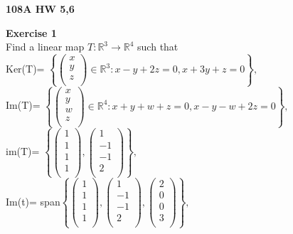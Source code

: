 \documentclass[12pt]{amsart}
\begin{document}
\begin{center}
{\bf 108A HW 5,6 }\\
\end{center}
\textbf{Exercise 1}\\
Find a linear map $T: \mathbb{R}^3 \rightarrow \mathbb{R}^4$ such that\\
Ker(T)= $\left\{\begin{pmatrix}
x\\
y\\
z\\
\end{pmatrix} \in \mathbb{R}^3: x-y+2z=0, x+3y+z=0\right\},$\\
Im(T)= $\left\{\begin{pmatrix}
x\\
y\\
w\\
z\\
\end{pmatrix} \in \mathbb{R}^4: x+y+w+z=0, x-y-w+2z=0\right\},$\\
im(T)= $\left\{\begin{pmatrix}
1\\
1\\
1\\
1\\
\end{pmatrix}, \begin{pmatrix}
1\\
-1\\
-1\\
2\\
\end{pmatrix}\right\},$\\
Im(t)= span$\left\{\begin{pmatrix}
1\\
1\\
1\\
1\\
\end{pmatrix}, \begin{pmatrix}
1\\
-1\\
-1\\
2\\
\end{pmatrix}, \begin{pmatrix}
2\\
0\\
0\\
3\\
\end{pmatrix}\right\},$\\
\end{document}
